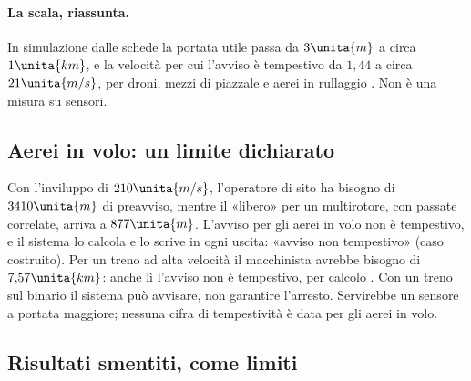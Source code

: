 \paragraph{La scala, riassunta.} In simulazione dalle schede la portata utile passa da $3\unita{m}$ a circa $1\unita{km}$, e la velocità per cui l'avviso è tempestivo da $1{,}44$ a circa $21\unita{m/s}$, per droni, mezzi di piazzale e aerei in rullaggio . Non è una misura su sensori.

\subsection{Aerei in volo: un limite dichiarato}\label{sec:lp-volo}

Con l'inviluppo di $210\unita{m/s}$, l'operatore di sito ha bisogno di $3410\unita{m}$ di preavviso, mentre il «libero» per un multirotore, con passate correlate, arriva a $877\unita{m}$. L'avviso per gli aerei in volo non è tempestivo, e il sistema lo calcola e lo scrive in ogni uscita: «avviso non tempestivo»  (caso costruito). Per un treno ad alta velocità il macchinista avrebbe bisogno di $7{,}57\unita{km}$: anche lì l'avviso non è tempestivo, per calcolo . Con un treno sul binario il sistema può avvisare, non garantire l'arresto. Servirebbe un sensore a portata maggiore; nessuna cifra di tempestività è data per gli aerei in volo.

\subsection{Risultati smentiti, come limiti}\label{sec:lp-smentiti}

